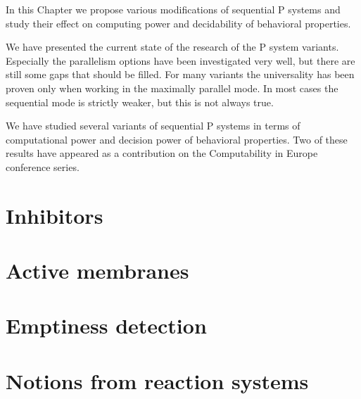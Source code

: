 In this Chapter we propose various modifications of sequential P systems and study their effect on computing power and decidability of behavioral properties.

We have presented the current state of the research of the P system variants. Especially the parallelism options have been investigated very well, but there are still some gaps that should be filled. For many variants the universality has been proven only when working in the maximally parallel mode. In most cases the sequential mode is strictly weaker, but this is not always true.

We have studied several variants of sequential P systems in terms of computational power and decision power of behavioral properties. Two of these results have appeared as a contribution on the Computability in Europe conference series.

\section{Inhibitors} %
\label{sec:inhibitors}


\section{Active membranes} %
\label{sec:active_membranes}


\section{Emptiness detection} %
\label{sec:emptiness_detection}


\section{Notions from reaction systems} %
\label{sec:notions_from_reaction_systems}

